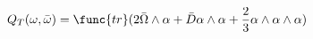 \begin{equation}
Q_{T}(\omega ,\bar{\omega})=\func{tr}(2\bar{\Omega }\wedge \alpha
+ {\bar D}\alpha \wedge \alpha +\frac{2}{3}\alpha \wedge \alpha
\wedge \alpha ) \label{eqn:T3F-2}
\end{equation}

